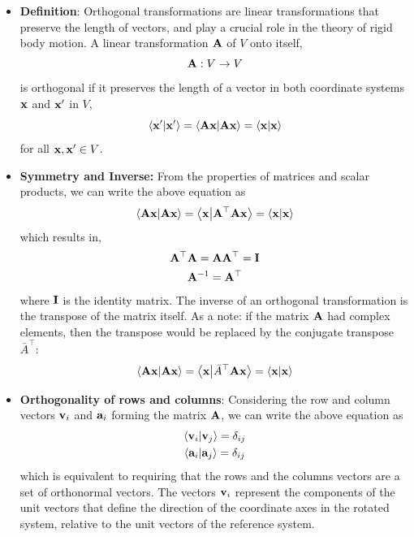 \documentclass[12pt]{article}
\begin{document}
\begin{itemize}
  \item \textbf{Definition}: Orthogonal transformations are linear transformations that
        preserve the length of vectors, and play a crucial role in the theory of rigid body
        motion. A linear transformation $\vb{A}$ of $V$ onto itself,
        \begin{equation}
          \vb{A}: V \to V
        \end{equation}
        is orthogonal if it preserves the length of a vector in both coordinate systems
        $\vb{x}$ and $\vb{x}'$ in $V$,
        \begin{equation}
          \ip{\vb{x}'}{\vb{x}'} = \ip{\vb{A}\vb{x}}{\vb{A}\vb{x}} = \ip{\vb{x}}{\vb{x}}
        \end{equation}
        for all $\vb{x}, \vb{x}' \in V$.

  \item \textbf{Symmetry and Inverse:} From the properties of matrices and scalar products,
        we can write the above equation as
        \begin{equation}
          \ip{\vb{A}\vb{x}}{\vb{A}\vb{x}} = \ip{\vb{x}}{\vb{A}^\top\vb{A}\vb{x}} = \ip{\vb{x}}{\vb{x}}
        \end{equation}
        which results in,
        \begin{equation}
          \begin{gathered}
            \vb{A}^\top\vb{A} = \vb{A}\vb{A}^\top = \vb{I} \\
            \vb{A}^{-1} = \vb{A}^\top
          \end{gathered}
        \end{equation}
        where $\vb{I}$ is the identity matrix. The inverse of an orthogonal transformation is
        the transpose of the matrix itself. As a note: if the matrix $\vb{A}$ had complex
        elements, then the transpose would be replaced by the conjugate transpose
        $\bar{A}^\top$:
        \begin{equation}
          \ip{\vb{A}\vb{x}}{\vb{A}\vb{x}} = \ip{\vb{x}}{\bar{A}^\top\vb{A}\vb{x}} = \ip{\vb{x}}{\vb{x}}
        \end{equation}

  \item \textbf{Orthogonality of rows and columns}: Considering the row and column vectors
        $\vb{v}_i$ and $\vb{a}_i$ forming the matrix $\vb{A}$, we can write the above
        equation as
        \begin{equation}
          \begin{gathered}
            \ip{\vb{v}_i}{\vb{v}_j} = \delta_{ij} \\
            \ip{\vb{a}_i}{\vb{a}_j} = \delta_{ij}
          \end{gathered}
        \end{equation}
        which is equivalent to requiring that the rows and the columns vectors are a set of
        orthonormal vectors. The vectors $\vb{v}_i$ represent the components of the unit
        vectors that define the direction of the coordinate axes in the rotated system,
        relative to the unit vectors of the reference system.


\end{itemize}
\end{document}
